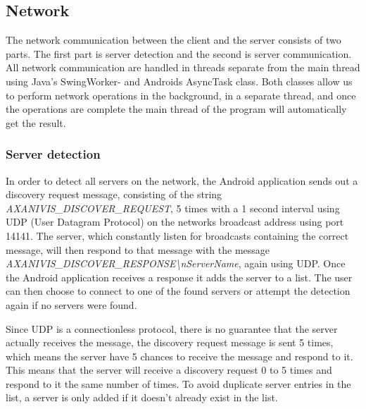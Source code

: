 \documentclass[12pt,a4paper,notitlepage]{report}
\begin{document}
\subsection{Network}
The network communication between the client and the server consists of two parts. The first part is server detection and the second is server communication. All network communication are handled in threads separate from the main thread using Java's SwingWorker- and Androids AsyncTask class. Both classes allow us to perform network operations in the background, in a separate thread, and once the operations are complete the main thread of the program will automatically get the result.


\subsubsection{Server detection}
In order to detect all servers on the network, the Android application sends out a discovery request message, consisting of the string \\ \textit{AXANIVIS\_DISCOVER\_REQUEST}, 5 times with a 1 second interval using UDP (User Datagram Protocol) on the networks broadcast address using port 14141. The server, which constantly listen for broadcasts containing the correct message, will then respond to that message with the message \textit{AXANIVIS\_DISCOVER\_RESPONSE\textbackslash nServerName}, again using UDP. Once the Android application receives a response it adds the server to a list. The user can then choose to connect to one of the found servers or attempt the detection again if no servers were found.

Since UDP is a connectionless protocol, there is no guarantee that the server actually receives the message, the discovery request message is sent 5 times, which means the server have 5 chances to receive the message and respond to it. This means that the server will receive a discovery request 0 to 5 times and respond to it the same number of times. To avoid duplicate server entries in the list, a server is only added if it doesn't already exist in the list.

\end{document}
